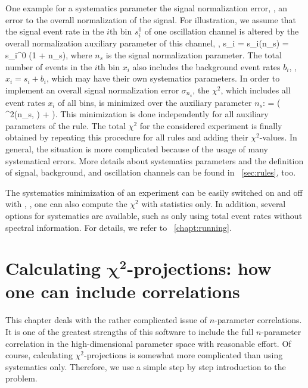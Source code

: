  One example for a systematics parameter the signal normalization error, \ie, an error to the overall normalization of the signal. For illustration, we assume that the signal event rate in the $i$th bin $s_i^0$ of one oscillation channel is altered by the overall normalization auxiliary parameter of this channel, \ie , 
\be
 s_i = s_i(n_s) = s_i^0 \cdot (1 + n_s),
\ee
where $n_s$ is the signal normalization parameter. The total number of events in the $i$th bin $x_i$ also includes the background event rates $b_i$, \ie, $x_i = s_i + b_i$, which may have their own systematics parameters.
In order to implement an overall signal normalization error $\sigma_{n_s}$,  the $\chi^2$, which includes all event rates $x_i$ of all bins, is minimized over the auxiliary parameter $n_s$:
\be
  =  \left(  \chi^2(n_s, \hdots) +  \right).
\ee 
This minimization is done independently for all auxiliary parameters of the rule. The total $\chi^2$ for the considered experiment is finally obtained by repeating this procedure for all rules and adding their $\chi^2$-values. In general, the situation is more complicated because of the usage of many systematical errors. More details about systematics parameters and the definition of signal, background, and oscillation channels can be found in \Sec~\ref{sec:rules}, too.

The systematics minimization of an experiment can be easily switched on and off with , \ie, one can also compute the $\chi^2$ with statistics only. In addition, several options for 
systematics are available, such as only using total event rates without
spectral information. For details, we refer to \Chapt~\ref{chapt:running}.

\chapter[Calculating $\chi^2$-projections: how one can include correlations]{Calculating $\boldsymbol{\chi^2}$-projections: how one can include correlations}
\label{chapt:correlations}

This chapter deals with the rather complicated issue of $n$-parameter correlations. It is one of the greatest strengths of this software 
to include the full $n$-parameter correlation in the high-dimensional parameter space with reasonable effort. Of course, calculating $\chi^2$-projections is somewhat more complicated than using systematics only. Therefore, we use a simple step by step introduction to the problem. 

